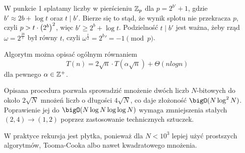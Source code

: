 W punkcie 1 splatamy liczby w pierścieniu \( \mathbb{Z}_p \) dla \( p = 2^{b'} + 1 \), gdzie \( b' \approx 2b + \log t \) oraz \( t \mid b' \). Bierze się to stąd, że wynik splotu nie przekracza \( p \), czyli \( p > t \cdot \left(2^b\right)^2 \), więc \( b′ \geq 2^b + \log t \).
Podzielność \( t \mid b' \) jest ważna, żeby rząd \( \omega = 2^{\frac{2b}{t}} \) był równy \( t \), czyli \( \omega^{\frac{t}{2}} = 2^b' = -1 \pmod{p} \).

Algorytm można opisać ogólnym równaniem
\[
    T(n) = 2 \sqrt{n} \cdot T(\alpha \sqrt{n}) + \Theta(n log n)
\]
dla pewnego \( \alpha \in \mathbb{Z}^{+} \).

Opisana procedura pozwala sprowadzić mnożenie dwóch liczb \( N \)-bitowych do około \( 2\sqrt{N} \) mnożeń liczb o długości \( 4\sqrt{N} \), co daje złożoność \( \bigO(N \log^2 N) \).
Poprawienie jej do \( \bigO(N \log N \log \log N) \) wymaga zmniejszenia stałych \( (2, 4) \rightarrow (1, 2) \) poprzez zastosowanie technicznych sztuczek.
        
W praktyce rekursja jest płytka, ponieważ dla \( N < 10^3 \) lepiej użyć prostszych algorytmów, Tooma-Cooka albo nawet kwadratowego mnożenia.